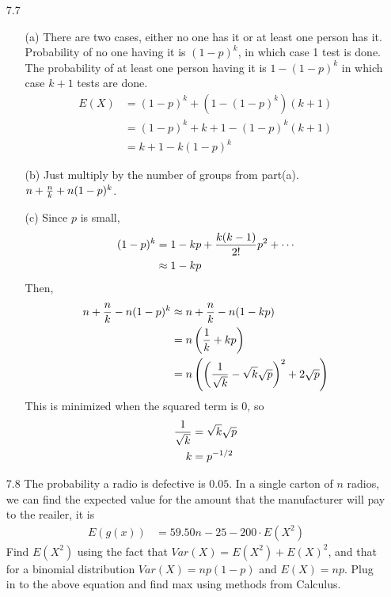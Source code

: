 \documentclass[english, 11pt]{article}
\begin{document}
\begin{itemize}
  \item[7.7]
  \begin{itemize}
    \item[(a)] There are two cases, either no one has it or at least one person has it. Probability of no one having it is $(1-p)^k$, in which case 1 test is done. The probability of at least one person having it is $1 - (1-p)^k$ in which case $k + 1$ tests are done.
    \begin{align*}
      E(X) & = (1-p)^k + (1-(1-p)^k)(k+1) \\
           & = (1-p)^k + k + 1 - (1-p)^k(k+1) \\
           & = k + 1 - k(1-p)^k
    \end{align*}
    \item[(b)] Just multiply by the number of groups from part(a). $n + \frac{n}{k} + n(1-p)^k$.
    \item[(c)]
    Since $p$ is small,
    \begin{align*}
      (1-p)^k & = 1 - kp + \frac{k(k-1)}{2!}p^2 + \cdots \\
      & \approx 1 - kp
    \end{align*}
    Then,
    \begin{align*}
      n + \frac{n}{k} - n(1-p)^k  & \approx n + \frac{n}{k} - n(1-kp) \\
      & = n \left( \frac{1}{k} + kp \right) \\
      & = n \left( \left( \frac{1}{\sqrt{k}} - \sqrt{k}\sqrt{p} \right)^2 + 2\sqrt{p} \right)
    \end{align*}
    This is minimized when the squared term is 0, so
    \begin{align*}
      \frac{1}{\sqrt{k}} & = \sqrt{k}\sqrt{p} \\
      k & = p^{-1/2}
    \end{align*}
  \end{itemize}

  \item[7.8] The probability a radio is defective is $0.05$. In a single carton of $n$ radios, we can find the expected value for the amount that the manufacturer will pay to the reailer, it is
  \begin{align*}
    E(g(x)) & = 59.50n - 25 - 200\cdot E(X^2)
  \end{align*}
  Find $E(X^2)$ using the fact that $Var(X) = E(X^2) + E(X)^2$, and that for a binomial distribution $Var(X) = np(1-p)$ and $E(X) = np$. Plug in to the above equation and find max using methods from Calculus.


\end{itemize}
\end{document}
